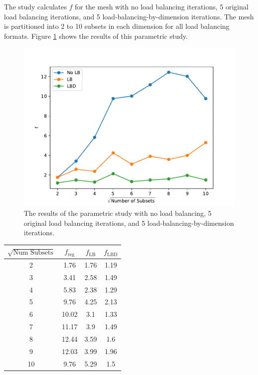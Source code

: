 The study calculates $f$ for the mesh with no load balancing iterations, 5 original load balancing iterations, and 5 load-balancing-by-dimension iterations. 
The mesh is partitioned into 2 to 10 subsets in each dimension for all load balancing formats. 
Figure \ref{metric_study} shows the results of this parametric study. 
\begin{figure}[H]
\centering
\includegraphics[scale=0.75]{../figures/metric_study.pdf}
\caption{The results of the parametric study with no load balancing, 5 original load balancing iterations, and 5 load-balancing-by-dimension iterations.}
\label{metric_study}
\end{figure}

\begin{table}[H]
\centering
\begin{tabular}{c|c|c|c}
\textbf{$\sqrt{\text{Num Subsets}}$} & \bf $f_{\text{reg}}$ & \bf $f_{\text{LB}}$  & \bf $f_{\text{LBD}}$\\ \hline 
2&1.76&1.76&1.19\\ \hline 
3&3.41&2.58&1.49\\ \hline 
4&5.83&2.38&1.29\\ \hline 
5&9.76&4.25&2.13\\ \hline 
6&10.02&3.1&1.33\\ \hline 
7&11.17&3.9&1.49\\ \hline 
8&12.44&3.59&1.6\\ \hline 
9&12.03&3.99&1.96\\ \hline 
10&9.76&5.29&1.5

\end{tabular}
\end{table}


